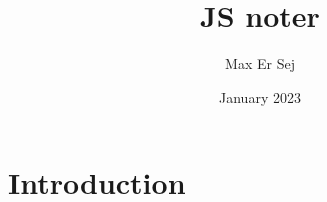 \documentclass{article}
\title{JS noter}
\author{Max Er Sej}
\date{January 2023}
\begin{document}
\maketitle

\section{Introduction}
\end{document}
